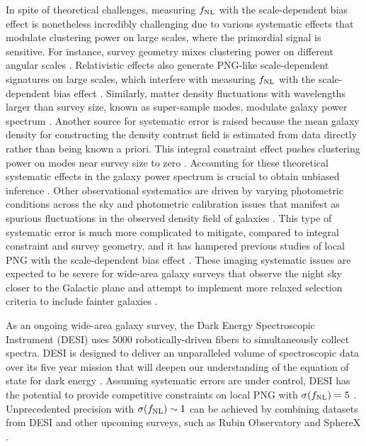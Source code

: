 In spite of theoretical challenges, measuring $f_{\rm NL}$ with the scale-dependent bias effect is nonetheless incredibly challenging due to various systematic effects that modulate clustering power on large scales, where the primordial signal is sensitive. For instance, survey geometry mixes clustering power on different angular scales \citep{beutler2014clustering,wilson2017rapid}. Relativistic effects also generate PNG-like scale-dependent signatures on large scales, which interfere with measuring $f_{\rm NL}$ with the scale-dependent bias effect \citep{wang2020}. Similarly, matter density fluctuations with wavelengths larger than survey size, known as super-sample modes, modulate galaxy power spectrum \citep{castorina2020JCAP}. Another source for systematic error is raised because the mean galaxy density for constructing the density contrast field is estimated from data directly rather than being known a priori. This integral constraint effect pushes clustering power on modes near survey size to zero \citep{peacock1991large,de2019integral}. Accounting for these theoretical systematic effects in the galaxy power spectrum is crucial to obtain unbiased inference \citep[see, e.g.,][]{riquelme2022primordial}. Other observational systematics are driven by varying photometric conditions across the sky \citep{ross2011} and photometric calibration issues that manifest as spurious fluctuations in the observed density field of galaxies \citep{huterer2013calibration}. This type of systematic error is much more complicated to mitigate, compared to integral constraint and survey geometry, and it has hampered previous studies of local PNG with the scale-dependent bias effect \citep[see, e.g.,][]{pullen2013systematic, Ho2015JCAP...05..040H}. These imaging systematic issues are expected to be severe for wide-area galaxy surveys that observe the night sky closer to the Galactic plane and attempt to implement more relaxed selection criteria to include fainter galaxies \citep[see, e.g,][]{kitanidis2020imaging}. 
 
As an ongoing wide-area galaxy survey, the Dark Energy Spectroscopic Instrument (DESI) uses $5000$ robotically-driven fibers to simultaneously collect spectra. DESI is designed to deliver an unparalleled volume of spectroscopic data over its five year mission that will deepen our understanding of the equation of state for dark energy \citep{aghamousa2016desi}. Assuming systematic errors are under control, DESI has the potential to provide competitive constraints on local PNG with $\sigma(f_{\rm NL})=5$ \citep{aghamousa2016desi}. Unprecedented precision with $\sigma (f_{\rm NL}) \sim 1$ can be achieved by combining datasets from DESI and other upcoming surveys, such as Rubin Observatory and SphereX \citep[see, e.g.,][]{Heinrich2022AAS...24020203H}.
 
